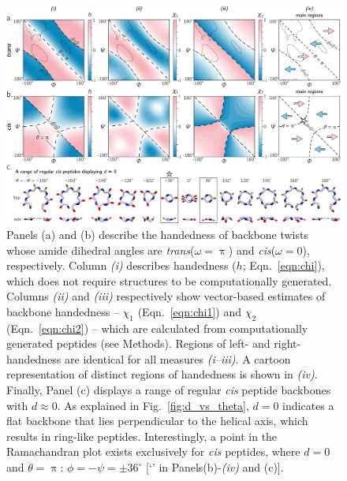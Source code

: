 \documentclass[fleqn,10pt,lineno]{wlpeerj} %
\newcommand{\n}[1]{{\color{black}#1}} %
\newcommand{\Fig}[1]{Fig.~\ref{#1}}
\newcommand{\Eqn}[1]{Eqn.~\ref{#1}}
\newcommand{\h}{h}
\newcommand{\cis}{{\em{cis}}\xspace}
\newcommand{\trans}{{\em{trans}}\xspace}
\begin{document}
\begin{figure}[t!]
\begin{adjustwidth}{-1in}{0in} %
\centering
\includegraphics[width=0.9\linewidth]{./figures/various_chis.pdf}
\caption{\label{fig:chi_all} 
Panels (a) and (b) describe the handedness of backbone twists whose amide dihedral angles are \trans ($\omega=\uppi$) and \cis ($\omega=0$), respectively. Column \textit{(i)} describes handedness (\n{$\h$;} \Eqn{eqn:chi}), which does not require structures to be computationally generated. Columns \textit{(ii)} and \textit{(iii)} respectively show vector-based estimates of backbone handedness -- $\chi_1$ (\Eqn{eqn:chi1}) and $\chi_2$ (\Eqn{eqn:chi2}) -- which are calculated from computationally generated peptides (see Methods). Regions of left- and right-handedness are identical for all measures \textit{(i--iii)}. \n{A cartoon representation of distinct regions of handedness is shown in \textit{(iv)}.}  Finally, Panel (c) displays a range of regular \cis peptide backbones with $d\approx0$. As explained \n{in} \Fig{fig:d_vs_theta}, $d=0$ indicates \n{a flat backbone that lies perpendicular to the helical axis, which results in ring-like peptides}. Interestingly, a point in the Ramachandran plot exists exclusively for \cis peptides, where $d=0$ and $\theta=\uppi$: $\phi=-\psi=\pm 36^\circ$ [`\FiveStarOpen' in Panels(b)-\textit{(iv)} and (c)]. }
\end{adjustwidth}
\end{figure}
\end{document}

